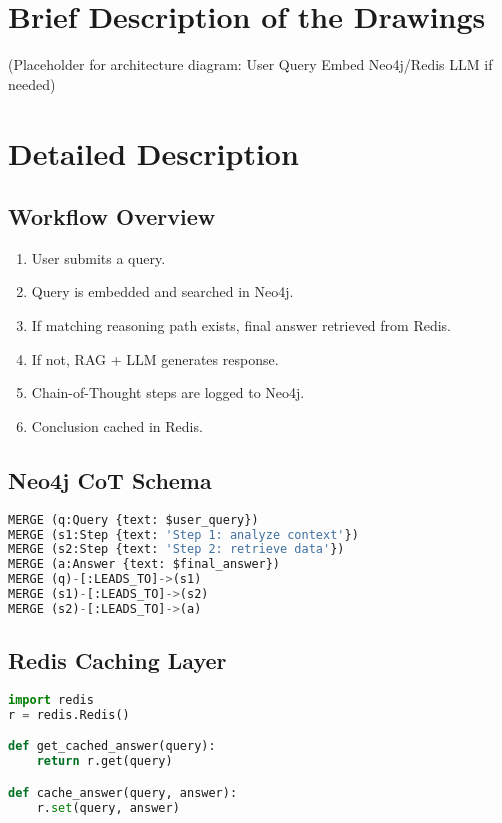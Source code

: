 \documentclass[12pt]{article}
\begin{document}
\section*{Brief Description of the Drawings}
(Placeholder for architecture diagram: User \textrightarrow Query \textrightarrow Embed \textrightarrow Neo4j/Redis \textrightarrow LLM if needed)

\section*{Detailed Description}

\subsection*{Workflow Overview}
\begin{enumerate}
  \item User submits a query.
  \item Query is embedded and searched in Neo4j.
  \item If matching reasoning path exists, final answer retrieved from Redis.
  \item If not, RAG + LLM generates response.
  \item Chain-of-Thought steps are logged to Neo4j.
  \item Conclusion cached in Redis.
\end{enumerate}

\subsection*{Neo4j CoT Schema}
\begin{lstlisting}[language=Python, caption=Creating CoT nodes in Neo4j]
MERGE (q:Query {text: $user_query})
MERGE (s1:Step {text: 'Step 1: analyze context'})
MERGE (s2:Step {text: 'Step 2: retrieve data'})
MERGE (a:Answer {text: $final_answer})
MERGE (q)-[:LEADS_TO]->(s1)
MERGE (s1)-[:LEADS_TO]->(s2)
MERGE (s2)-[:LEADS_TO]->(a)
\end{lstlisting}

\subsection*{Redis Caching Layer}
\begin{lstlisting}[language=Python, caption=Caching and retrieving with Redis]
import redis
r = redis.Redis()

def get_cached_answer(query):
    return r.get(query)

def cache_answer(query, answer):
    r.set(query, answer)
\end{lstlisting}
\end{document}
